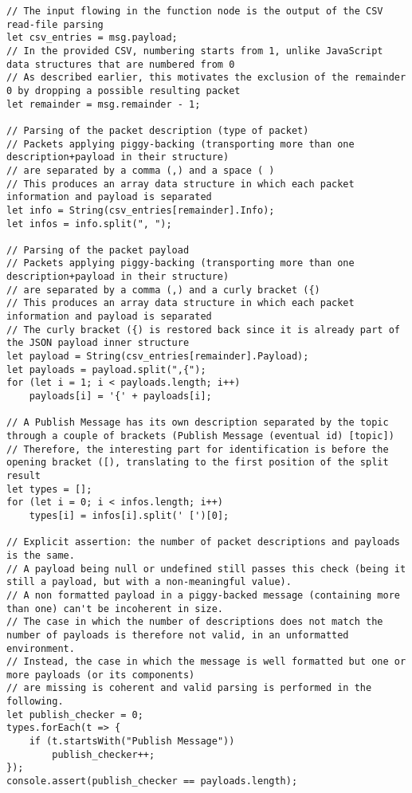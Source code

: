\documentclass[a4paper,11pt]{article} %
\begin{document}
    \begin{verbatim}
// The input flowing in the function node is the output of the CSV read-file parsing
let csv_entries = msg.payload;
// In the provided CSV, numbering starts from 1, unlike JavaScript data structures that are numbered from 0
// As described earlier, this motivates the exclusion of the remainder 0 by dropping a possible resulting packet
let remainder = msg.remainder - 1;

// Parsing of the packet description (type of packet)
// Packets applying piggy-backing (transporting more than one description+payload in their structure)
// are separated by a comma (,) and a space ( )
// This produces an array data structure in which each packet information and payload is separated
let info = String(csv_entries[remainder].Info);
let infos = info.split(", ");

// Parsing of the packet payload
// Packets applying piggy-backing (transporting more than one description+payload in their structure)
// are separated by a comma (,) and a curly bracket ({)
// This produces an array data structure in which each packet information and payload is separated
// The curly bracket ({) is restored back since it is already part of the JSON payload inner structure
let payload = String(csv_entries[remainder].Payload);
let payloads = payload.split(",{");
for (let i = 1; i < payloads.length; i++)
    payloads[i] = '{' + payloads[i];

// A Publish Message has its own description separated by the topic through a couple of brackets (Publish Message (eventual id) [topic])
// Therefore, the interesting part for identification is before the opening bracket ([), translating to the first position of the split result
let types = [];
for (let i = 0; i < infos.length; i++)
    types[i] = infos[i].split(' [')[0];

// Explicit assertion: the number of packet descriptions and payloads is the same.
// A payload being null or undefined still passes this check (being it still a payload, but with a non-meaningful value).
// A non formatted payload in a piggy-backed message (containing more than one) can't be incoherent in size.
// The case in which the number of descriptions does not match the number of payloads is therefore not valid, in an unformatted environment.
// Instead, the case in which the message is well formatted but one or more payloads (or its components)
// are missing is coherent and valid parsing is performed in the following.
let publish_checker = 0;
types.forEach(t => {
    if (t.startsWith("Publish Message"))
        publish_checker++;
});
console.assert(publish_checker == payloads.length);


\end{verbatim}
\end{document}
